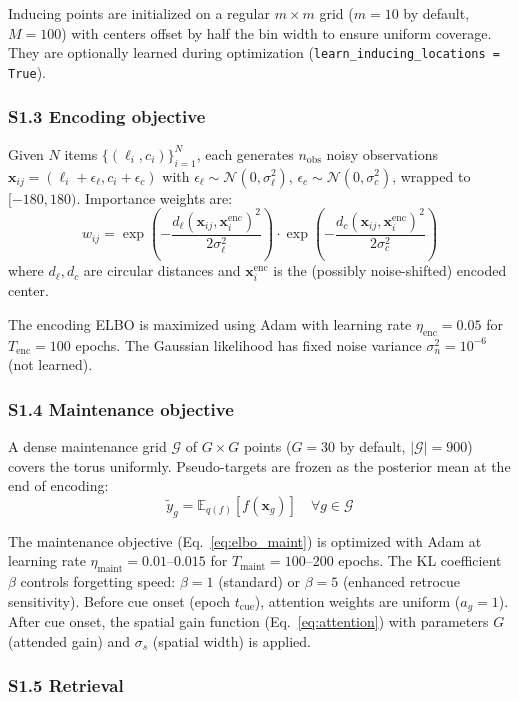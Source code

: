 \documentclass[11pt,letterpaper]{article}
\newcommand{\E}{\mathbb{E}}
\newcommand{\bx}{\mathbf{x}}
\begin{document}
Inducing points are initialized on a regular $m \times m$ grid ($m = 10$ by default, $M = 100$) with centers offset by half the bin width to ensure uniform coverage. They are optionally learned during optimization (\texttt{learn\_inducing\_locations = True}).

\subsubsection*{S1.3 Encoding objective}

Given $N$ items $\{(\ell_i, c_i)\}_{i=1}^N$, each generates $n_{\mathrm{obs}}$ noisy observations $\bx_{ij} = (\ell_i + \epsilon_{\ell}, c_i + \epsilon_c)$ with $\epsilon_\ell \sim \mathcal{N}(0, \sigma_\ell^2)$, $\epsilon_c \sim \mathcal{N}(0, \sigma_c^2)$, wrapped to $[-180, 180)$. Importance weights are:
\[
w_{ij} = \exp\!\left(-\frac{d_\ell(\bx_{ij}, \bx_i^{\mathrm{enc}})^2}{2\sigma_\ell^2}\right) \cdot \exp\!\left(-\frac{d_c(\bx_{ij}, \bx_i^{\mathrm{enc}})^2}{2\sigma_c^2}\right)
\]
where $d_\ell, d_c$ are circular distances and $\bx_i^{\mathrm{enc}}$ is the (possibly noise-shifted) encoded center.

The encoding ELBO is maximized using Adam with learning rate $\eta_{\mathrm{enc}} = 0.05$ for $T_{\mathrm{enc}} = 100$ epochs. The Gaussian likelihood has fixed noise variance $\sigma_n^2 = 10^{-6}$ (not learned).

\subsubsection*{S1.4 Maintenance objective}

A dense maintenance grid $\mathcal{G}$ of $G \times G$ points ($G = 30$ by default, $|\mathcal{G}| = 900$) covers the torus uniformly. Pseudo-targets are frozen as the posterior mean at the end of encoding:
\[
\tilde{y}_g = \E_{q(f)}[f(\bx_g)] \quad \forall g \in \mathcal{G}
\]

The maintenance objective (Eq.~\ref{eq:elbo_maint}) is optimized with Adam at learning rate $\eta_{\mathrm{maint}} = 0.01$--$0.015$ for $T_{\mathrm{maint}} = 100$--$200$ epochs. The KL coefficient $\beta$ controls forgetting speed: $\beta = 1$ (standard) or $\beta = 5$ (enhanced retrocue sensitivity). Before cue onset (epoch $t_{\mathrm{cue}}$), attention weights are uniform ($a_g = 1$). After cue onset, the spatial gain function (Eq.~\ref{eq:attention}) with parameters $G$ (attended gain) and $\sigma_s$ (spatial width) is applied.

\subsubsection*{S1.5 Retrieval}
\end{document}
